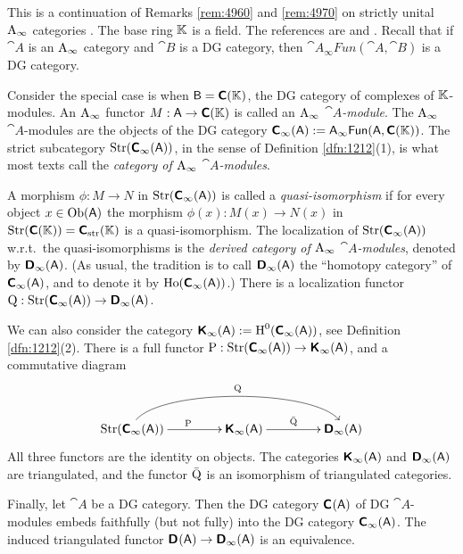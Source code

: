 \begin{rem} \label{rem:4971}
This is a continuation of Remarks \ref{rem:4960} and \ref{rem:4970} on strictly 
unital 
$\mathrm{A}_{\infty}$ categories%
.
The base ring $\mathbb{K}$ is a field. 
The references are \cite{Kel5} and \cite{COS}.
Recall that if $\cat{A}$ is an  
$\mathrm{A}_{\infty}$ category and $\cat{B}$ is a DG category, then 
$\cat{A_{\infty}Fun}(\cat{A}, \cat{B})$
is a DG category. 

Consider the special case is when $\operatorname{\mathsf{B}} = \boldsymbol{\mathsf{C}}(\mathbb{K})$, the DG category of 
complexes of $\mathbb{K}$-modules. An $\mathrm{A}_{\infty}$ functor 
$M : \operatorname{\mathsf{A}} \to \boldsymbol{\mathsf{C}}(\mathbb{K})$ is called an {\em $\mathrm{A}_{\infty}$ 
$\cat{A}$-module}. 
The $\mathrm{A}_{\infty}$ $\cat{A}$-modules are the objects of the DG category 
$\boldsymbol{\mathsf{C}}_{\infty}(\operatorname{\mathsf{A}}) := \operatorname{\mathsf{A_{\infty}Fun}}(\operatorname{\mathsf{A}}, \boldsymbol{\mathsf{C}}(\mathbb{K}))$. 
The strict subcategory $\operatorname{Str}(\boldsymbol{\mathsf{C}}_{\infty}(\operatorname{\mathsf{A}}))$, in the sense of
Definition \ref{dfn:1212}(1), is what most texts call the {\em category 
of $\mathrm{A}_{\infty}$ $\cat{A}$-modules}. 

A morphism $\phi : M \to N$ in $\operatorname{Str}(\boldsymbol{\mathsf{C}}_{\infty}(\operatorname{\mathsf{A}}))$
is called a {\em quasi-isomorphism} if for every object 
$x \in \operatorname{Ob}(\operatorname{\mathsf{A}})$ the morphism 
$\phi(x) : M(x) \to N(x)$ in 
$\operatorname{Str}(\boldsymbol{\mathsf{C}}(\mathbb{K})) = \boldsymbol{\mathsf{C}}_{\mathrm{str}}(\mathbb{K})$ is a 
quasi-isomorphism. The localization of 
$\operatorname{Str}(\boldsymbol{\mathsf{C}}_{\infty}(\operatorname{\mathsf{A}}))$ w.r.t.\ 
the quasi-isomorphisms is the {\em derived category of $\mathrm{A}_{\infty}$
$\cat{A}$-modules}, denoted by $\boldsymbol{\mathsf{D}}_{\infty}(\operatorname{\mathsf{A}})$.
(As usual, the tradition is to call $\boldsymbol{\mathsf{D}}_{\infty}(\operatorname{\mathsf{A}})$ the ``homotopy 
category'' of $\boldsymbol{\mathsf{C}}_{\infty}(\operatorname{\mathsf{A}})$, and to denote 
it by $\operatorname{Ho}(\boldsymbol{\mathsf{C}}_{\infty}(\operatorname{\mathsf{A}}))$.)
There is a localization functor 
$\operatorname{Q} : \operatorname{Str}(\boldsymbol{\mathsf{C}}_{\infty}(\operatorname{\mathsf{A}})) \to 
\boldsymbol{\mathsf{D}}_{\infty}(\operatorname{\mathsf{A}})$.

We can also consider the category 
$\boldsymbol{\mathsf{K}}_{\infty}(\operatorname{\mathsf{A}}) := \operatorname{H}^0(\boldsymbol{\mathsf{C}}_{\infty}(\operatorname{\mathsf{A}}))$, see 
Definition \ref{dfn:1212}(2). There is a full functor 
$\operatorname{P} : \operatorname{Str}(\boldsymbol{\mathsf{C}}_{\infty}(\operatorname{\mathsf{A}})) \to 
\boldsymbol{\mathsf{K}}_{\infty}(\operatorname{\mathsf{A}})$,
and a commutative diagram 
\begin{equation} \label{eqn:4978}
\UseTips \xymatrix @C=10ex @R=6ex {
\opn{Str}(\dcat{C}_{\infty}(\cat{A}))
\ar[r]^{\opn{P}}
\ar@(u,u)[rr]^{\opn{Q}}
&
\dcat{K}_{\infty}(\cat{A})
\ar[r]^{\bar{\opn{Q}}}
&
\dcat{D}_{\infty}(\cat{A})
}
\end{equation}
All three functors are the identity on objects. 
The categories $\boldsymbol{\mathsf{K}}_{\infty}(\operatorname{\mathsf{A}})$ and 
$\boldsymbol{\mathsf{D}}_{\infty}(\operatorname{\mathsf{A}})$ are triangulated, and the functor $\bar{\operatorname{Q}}$ 
is an isomorphism of triangulated categories. 

Finally, let $\cat{A}$ be a DG category. Then the DG category 
$\boldsymbol{\mathsf{C}}_{}(\operatorname{\mathsf{A}})$ of DG $\cat{A}$-modules embeds faithfully (but not 
fully) into the DG category $\boldsymbol{\mathsf{C}}_{\infty}(\operatorname{\mathsf{A}})$.
The induced triangulated functor 
$\boldsymbol{\mathsf{D}}_{}(\operatorname{\mathsf{A}}) \to \boldsymbol{\mathsf{D}}_{\infty}(\operatorname{\mathsf{A}})$
is an equivalence. 
\end{rem}




